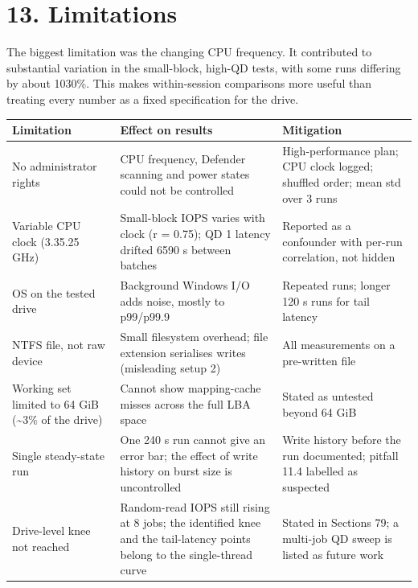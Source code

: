 \documentclass[10pt,letterpaper]{article}
\begin{document}
\par\noindent\begin{minipage}{\linewidth}
\section*{13. Limitations}

The biggest limitation was the changing CPU frequency. It contributed to substantial variation in the small-block, high-QD tests, with some runs differing by about 10\textendash{}30\%. This makes within-session comparisons more useful than treating every number as a fixed specification for the drive.


\par\smallskip
{\scriptsize
\noindent\begin{tabular}{>{\raggedright\arraybackslash}p{0.2500\dimexpr\linewidth-6\tabcolsep\relax}>{\raggedright\arraybackslash}p{0.3600\dimexpr\linewidth-6\tabcolsep\relax}>{\raggedright\arraybackslash}p{0.3900\dimexpr\linewidth-6\tabcolsep\relax}}
\toprule
\textbf{Limitation} & \textbf{Effect on results} & \textbf{Mitigation} \\ \midrule
No administrator rights & CPU frequency, Defender scanning and power states could not be controlled & High-performance plan; CPU clock logged; shuffled order; mean \textpm{} std over 3 runs \\
Variable CPU clock (3.3\textendash{}5.25 GHz) & Small-block IOPS varies with clock (r = 0.75); QD 1 latency drifted 65\textendash{}90 \textmu{}s between batches & Reported as a confounder with per-run correlation, not hidden \\
OS on the tested drive & Background Windows I/O adds noise, mostly to p99/p99.9 & Repeated runs; longer 120 s runs for tail latency \\
NTFS file, not raw device & Small filesystem overhead; file extension serialises writes (misleading setup 2) & All measurements on a pre-written file \\
Working set limited to 64 GiB (\textasciitilde{}3\% of the drive) & Cannot show mapping-cache misses across the full LBA space & Stated as untested beyond 64 GiB \\
Single steady-state run & One 240 s run cannot give an error bar; the effect of write history on burst size is uncontrolled & Write history before the run documented; pitfall 11.4 labelled as suspected \\
Drive-level knee not reached & Random-read IOPS still rising at 8 jobs; the identified knee and the tail-latency points belong to the single-thread curve & Stated in Sections 7\textendash{}9; a multi-job QD sweep is listed as future work \\

\end{tabular}}
\end{minipage}
\end{document}
